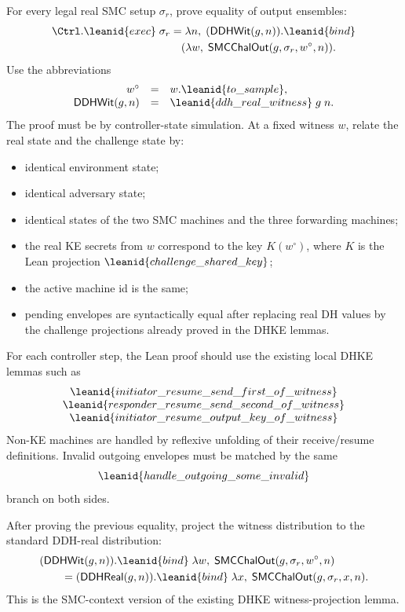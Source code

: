 \begin{obligation}
For every legal real SMC setup \(\sigma_r\), prove equality of output
ensembles:
\[
\begin{aligned}
  \Ctrl.\leanid{exec}\;\sigma_r
  &=
  \lambda n,\;
    (\DDHWit(g,n)).\leanid{bind}\\
  &\quad
      (\lambda w,\;
        \SMCChalOut(g,\sigma_r,w^\circ,n)).
\end{aligned}
\]
Use the abbreviations
\[
\begin{array}{rcl}
w^\circ &=& w.\leanid{to\_sample},\\
\DDHWit(g,n)&=&\leanid{ddh\_real\_witness}\;g\;n .
\end{array}
\]
The proof must be by controller-state simulation.  At a fixed witness \(w\),
relate the real state and the challenge state by:
\begin{itemize}
\item identical environment state;
\item identical adversary state;
\item identical states of the two SMC machines and the three forwarding
machines;
\item the real KE secrets from \(w\) correspond to the key \(K(w^\circ)\),
where \(K\) is the Lean projection \(\leanid{challenge\_shared\_key}\);
\item the active machine id is the same;
\item pending envelopes are syntactically equal after replacing real DH values
by the challenge projections already proved in the DHKE lemmas.
\end{itemize}
For each controller step, the Lean proof should use the existing local DHKE
lemmas such as
\[
\begin{array}{c}
\leanid{initiator\_resume\_send\_first\_of\_witness}\\
\leanid{responder\_resume\_send\_second\_of\_witness}\\
\leanid{initiator\_resume\_output\_key\_of\_witness}
\end{array}
\]
Non-KE machines are
handled by reflexive unfolding of their receive/resume definitions.  Invalid
outgoing envelopes must be matched by the same
\[
  \leanid{handle\_outgoing\_some\_invalid}
\]
branch on both sides.
\end{obligation}

\begin{obligation}
After proving the previous equality, project the witness distribution to the
standard DDH-real distribution:
\[
\begin{aligned}
&(\DDHWit(g,n)).\leanid{bind}\;
  \lambda w,\;
    \SMCChalOut(g,\sigma_r,w^\circ,n)\\
&\qquad =
(\DDHReal(g,n)).\leanid{bind}\;
  \lambda x,\;
    \SMCChalOut(g,\sigma_r,x,n).
\end{aligned}
\]
This is the SMC-context version of the existing DHKE witness-projection lemma.
\end{obligation}

